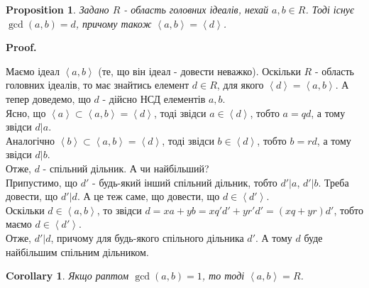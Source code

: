\documentclass[a4paper, 14pt]{extarticle}
\makeatletter
\theoremstyle{theoremdd}
\theoremstyle{theoremdd}
\newtheorem{definition}[theorem]{Definition}
\theoremstyle{theoremdd}
\theoremstyle{theoremdd}
\theoremstyle{theoremdd}
\newtheorem{proposition}[theorem]{Proposition}
\theoremstyle{theoremdd}
\theoremstyle{theoremdd}
\theoremstyle{theoremdd}
\newtheorem{corollary}[theorem]{Corollary}
\def\qed{$\blacksquare$}
\renewenvironment{proof}[1][Proof.\\]{\par
\pushQED{\hfill \qed}%
\normalfont \topsep6\p@\@plus6\p@\relax
\trivlist
\item\relax
{\bfseries
#1\@addpunct{.}}\hspace\labelsep\ignorespaces
}{%
\popQED\endtrivlist\@endpefalse
}
\makeatother
\begin{document}
\iffalse
\begin{definition}
Елемент $x \neq 0$ називається \textbf{найбільшим спільним дільником} елементів $x_1,\dots,x_n$, якщо $x$ ділиться на кожний інший спільний дільник чисел $x_1,\dots,x_n$.\\
Позначення (неформальне): $\gcd (x_1,\dots,x_n)$.
\end{definition}
\fi

\begin{proposition}
Задано $R$ - область головних ідеалів, нехай $a,b \in R$. Тоді існує $\gcd(a,b) = d$, причому також $\left<a,b\right> = \left<d\right>$.
\end{proposition}

\begin{proof}
Маємо ідеал $\left<a,b \right>$ (те, що він ідеал - довести неважко). Оскільки $R$ - область головних ідеалів, то має знайтись елемент $d \in R$, для якого $\left<d \right> = \left<a,b\right>$. А тепер доведемо, що $d$ - дійсно НСД елементів $a,b$.\\
Ясно, що $\left< a \right> \subset \left<a,b \right> = \left< d \right>$, тоді звідси $a \in \left< d \right>$, тобто $a = qd$, а тому звідси $d | a$.\\
Аналогічно $\left< b \right> \subset \left<a,b \right> = \left< d \right>$, тоді звідси $b \in \left< d \right>$, тобто $b = rd$, а тому звідси $d | b$.\\
Отже, $d$ - спільний дільник. А чи найбільший?\\
Припустимо, що $d'$ - будь-який інший спільний дільник, тобто $d' | a$, $d' | b$. Треба довести, що $d' | d$. А це теж саме, що довести, що $d \in \left<d' \right>$.\\
Оскільки $d \in \left< a,b \right>$, то звідси $d = xa + yb = xq'd' + yr'd' = (xq+yr)d'$, тобто маємо $d \in \left<d' \right>$.\\
Отже, $d' | d$, причому для будь-якого спільного дільника $d'$. А тому $d$ буде найбільшим спільним дільником.
\end{proof}

\begin{corollary}
Якщо раптом $\gcd(a,b) = 1$, то тоді $\left< a,b\right> = R$.
\end{corollary}

\iffalse
\begin{proof}
Дійсно, за попереднім твердженням, $\left< a,b\right> = \left<1\right>$, але от\\
$\left<1\right> = \{1 \cdot r | r \in R\} = R$.
\end{proof}
\fi
\end{document}
